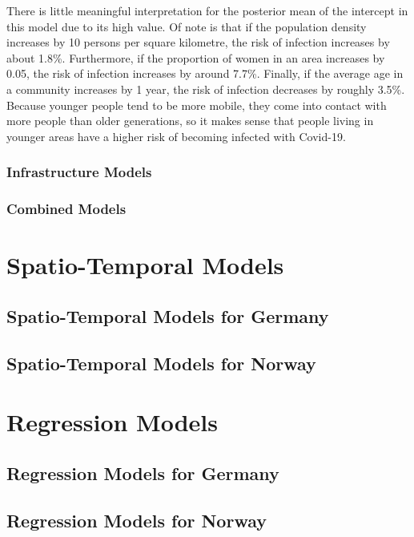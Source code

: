 There is little meaningful interpretation for the posterior mean of the intercept in this model due to its high value. Of note is that if the population density increases by 10 persons per square kilometre, the risk of infection increases by about 1.8\%. Furthermore, if the proportion of women in an area increases by 0.05, the risk of infection increases by around 7.7\%. Finally, if the average age in a community increases by 1 year, the risk of infection decreases by roughly 3.5\%. Because younger people tend to be more mobile, they come into contact with more people than older generations, so it makes sense that people living in younger areas have a higher risk of becoming infected with Covid-19.
\subsubsection{Infrastructure Models}
\subsubsection{Combined Models}
\clearpage
\section{Spatio-Temporal Models}
\subsection{Spatio-Temporal Models for Germany}
\subsection{Spatio-Temporal Models for Norway}
\section{Regression Models}
\clearpage
\subsection{Regression Models for Germany}
\subsection{Regression Models for Norway}